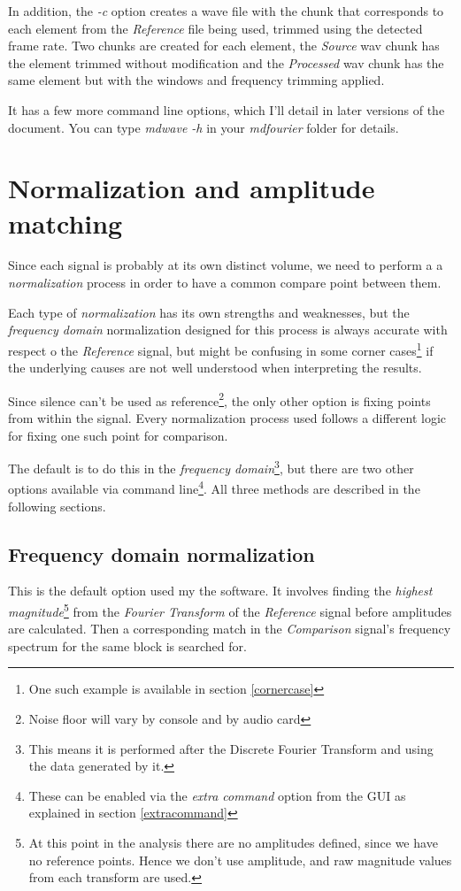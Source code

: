 \documentclass[10pt,a4paper]{report}
\begin{document}
\begin{appendices}
In addition, the \textit{-c} option creates a wave file with the chunk that corresponds to each element from the \textit{Reference} file being used, trimmed using the detected frame rate. Two chunks are created for each element, the \textit{Source} wav chunk has the element trimmed without modification and the \textit{Processed} wav chunk has the same element but with the windows and frequency trimming applied.

It has a few more command line options, which I'll detail in later versions of the document. You can type \textit{mdwave -h} in your \textit{mdfourier} folder for details.

\chapter{Normalization and amplitude matching}
\label{normalization}

Since each signal is probably at its own distinct volume, we need to perform a a \textit{normalization} process in order to have a common compare point between them.

Each type of \textit{normalization} has its own strengths and weaknesses, but the \textit{frequency domain} normalization designed for this process is always accurate with respect o the \textit{Reference} signal, but might be confusing in some corner cases\footnote{One such example is available in section \ref{cornercase}} if the underlying causes are not well understood when interpreting the results.

Since silence can't be used as reference\footnote{Noise floor will vary by console and by audio card}, the only other option is fixing points from within the signal. Every normalization process used follows a different logic for fixing one such point for comparison.

The default is to do this in the \textit{frequency domain}\footnote{This means it is performed after the Discrete Fourier Transform and using the data generated by it.}, but there are two other options available via command line\footnote{These can be enabled via the \textit{extra command} option from the GUI as explained in section \ref{extracommand}}. All three methods are described in the following sections.

\section{Frequency domain normalization}

This is the default option used my the software. It involves finding the \textit{highest magnitude}\footnote{At this point in the analysis there are no amplitudes defined, since we have no reference points. Hence we don't use amplitude, and raw magnitude values from each transform are used.} from the \textit{Fourier Transform} of the \textit{Reference} signal before amplitudes are calculated. Then a corresponding match in the \textit{Comparison} signal's frequency spectrum for the same block is searched for. 


\end{appendices}
\end{document}
